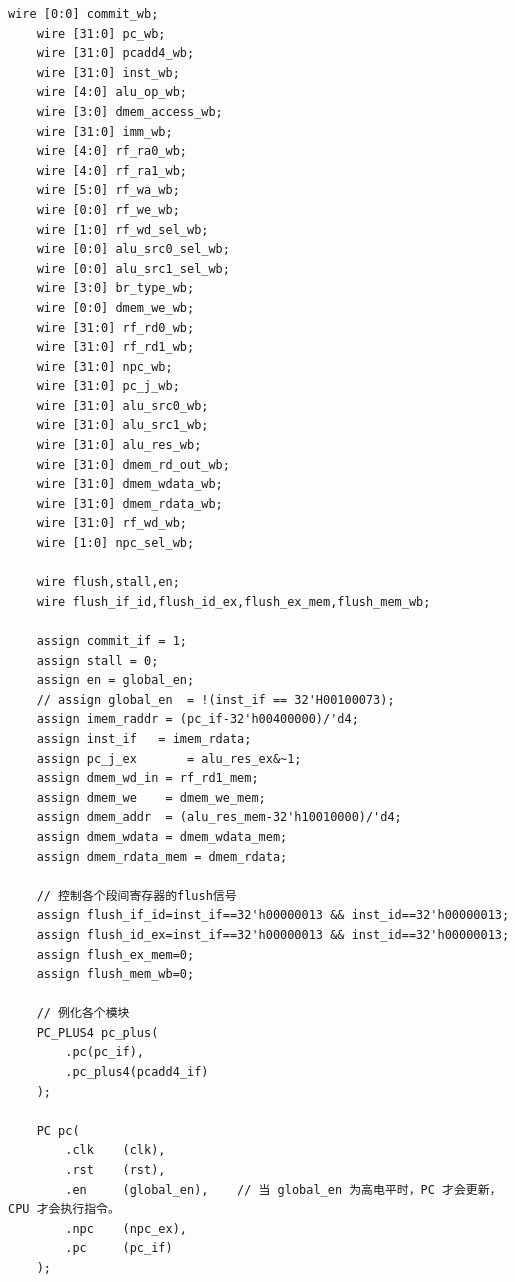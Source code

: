 \documentclass[12pt,a4paper]{ctexart}
\begin{document}
\begin{lstlisting}[style=verilog]
    wire [0:0] commit_wb;
    wire [31:0] pc_wb;
    wire [31:0] pcadd4_wb;
    wire [31:0] inst_wb;
    wire [4:0] alu_op_wb;
    wire [3:0] dmem_access_wb;
    wire [31:0] imm_wb;
    wire [4:0] rf_ra0_wb;
    wire [4:0] rf_ra1_wb;
    wire [5:0] rf_wa_wb;
    wire [0:0] rf_we_wb;
    wire [1:0] rf_wd_sel_wb;
    wire [0:0] alu_src0_sel_wb;
    wire [0:0] alu_src1_sel_wb;
    wire [3:0] br_type_wb;
    wire [0:0] dmem_we_wb;
    wire [31:0] rf_rd0_wb;
    wire [31:0] rf_rd1_wb;
    wire [31:0] npc_wb;
    wire [31:0] pc_j_wb;
    wire [31:0] alu_src0_wb;
    wire [31:0] alu_src1_wb;
    wire [31:0] alu_res_wb;
    wire [31:0] dmem_rd_out_wb;
    wire [31:0] dmem_wdata_wb;
    wire [31:0] dmem_rdata_wb;
    wire [31:0] rf_wd_wb;
    wire [1:0] npc_sel_wb;

    wire flush,stall,en;
    wire flush_if_id,flush_id_ex,flush_ex_mem,flush_mem_wb;

    assign commit_if = 1;
    assign stall = 0;
    assign en = global_en;
    // assign global_en  = !(inst_if == 32'H00100073);
    assign imem_raddr = (pc_if-32'h00400000)/'d4;
    assign inst_if   = imem_rdata;
    assign pc_j_ex       = alu_res_ex&~1;
    assign dmem_wd_in = rf_rd1_mem;
    assign dmem_we    = dmem_we_mem;
    assign dmem_addr  = (alu_res_mem-32'h10010000)/'d4;
    assign dmem_wdata = dmem_wdata_mem;
    assign dmem_rdata_mem = dmem_rdata;

    // 控制各个段间寄存器的flush信号
    assign flush_if_id=inst_if==32'h00000013 && inst_id==32'h00000013;
    assign flush_id_ex=inst_if==32'h00000013 && inst_id==32'h00000013;
    assign flush_ex_mem=0;
    assign flush_mem_wb=0;

    // 例化各个模块
    PC_PLUS4 pc_plus(
        .pc(pc_if),
        .pc_plus4(pcadd4_if)
    );
    
    PC pc(
        .clk    (clk),
        .rst    (rst),
        .en     (global_en),    // 当 global_en 为高电平时，PC 才会更新，CPU 才会执行指令。
        .npc    (npc_ex),
        .pc     (pc_if)
    );


\end{lstlisting}
\end{document}
